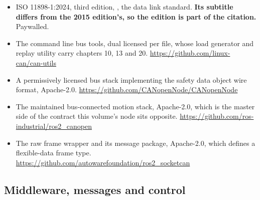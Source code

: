 \begin{itemize}[itemsep=2pt]
\item ISO 11898-1:2024, third edition, , the data link standard.
\textbf{Its subtitle differs from the 2015 edition's, so the edition is part of
the citation.} Paywalled.
\item The command line bus tools, dual licensed per file, whose load generator
and replay utility carry chapters 10, 13 and 20.\newline
\url{https://github.com/linux-can/can-utils}
\item A permissively licensed bus stack implementing the safety data object wire
format, Apache-2.0.\newline
\url{https://github.com/CANopenNode/CANopenNode}
\item The maintained bus-connected motion stack, Apache-2.0, which is the master
side of the contract this volume's node sits opposite.\newline
\url{https://github.com/ros-industrial/ros2_canopen}
\item The raw frame wrapper and its message package, Apache-2.0, which defines a
flexible-data frame type.\newline
\url{https://github.com/autowarefoundation/ros2_socketcan}
\end{itemize}

\subsection*{Middleware, messages and control}

